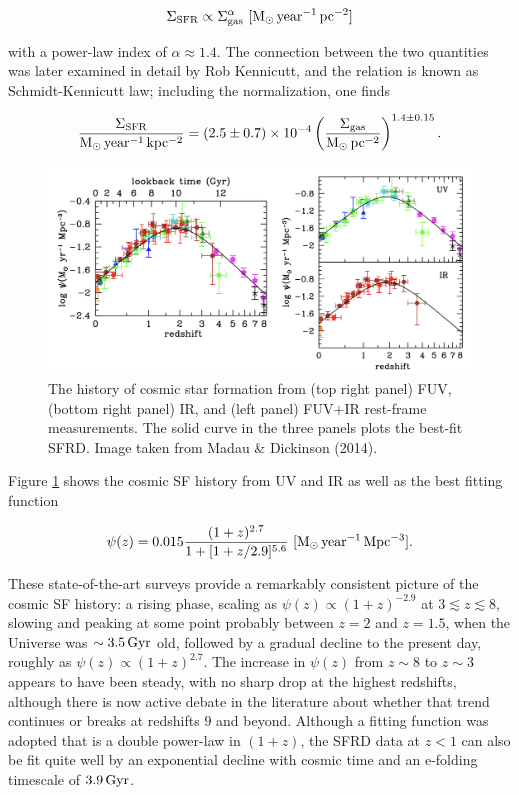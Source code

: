 \documentclass[a4paper,11pt]{article}
\begin{document}
\begin{align*}
    \Sigma_\mathrm{SFR} \propto \Sigma_\mathrm{gas}^\alpha ~ [{\rm M_\odot\,year^{-1}\,pc^{-2}}]
\end{align*}

{\noindent}with a power-law index of $\alpha\approx1.4$. The connection between the two quantities was later examined in detail by Rob Kennicutt, and the relation is known as Schmidt-Kennicutt law; including the normalization, one finds

\begin{align*}
    \frac{\Sigma_\mathrm{SFR}}{{\rm M_\odot\,year^{-1}\,kpc^{-2}}} = (2.5\pm0.7)\times10^{-4} \left(\frac{\Sigma_\mathrm{gas}}{{\rm M_\odot\,pc^{-2}}}\right)^{1.4\pm0.15}.
\end{align*}

\begin{figure}[h]
    \centering
    \includegraphics[width=16cm]{figures/SFhistory.png}
    \caption{\footnotesize{The history of cosmic star formation from (top right panel) FUV, (bottom right panel) IR, and (left panel) FUV+IR rest-frame measurements. The solid curve in the three panels plots the best-fit SFRD. Image taken from Madau \& Dickinson (2014).}}
    \label{fig:sfhistory}
\end{figure}

{\noindent}Figure \ref{fig:sfhistory} shows the cosmic SF history from UV and IR as well as the best fitting function

\begin{align*}
    \psi(z) = 0.015\frac{(1+z)^{2.7}}{1+[1+z/2.9]^{5.6}} ~ [{\rm M_\odot\,year^{-1}\,Mpc^{-3}}].
\end{align*}

{\noindent}These state-of-the-art surveys provide a remarkably consistent picture of the cosmic SF history: a rising phase, scaling as $\psi(z)\propto(1+z)^{-2.9}$ at $3\lesssim z\lesssim8$, slowing and peaking at some point probably between $z=2$ and $z=1.5$, when the Universe was $\sim3.5\,{\rm Gyr}$ old, followed by a gradual decline to the present day, roughly as $\psi(z)\propto(1+z)^{2.7}$. The increase in $\psi(z)$ from $z\sim8$ to $z\sim3$ appears to have been steady, with no sharp drop at the highest redshifts, although there is now active debate in the literature about whether that trend continues or breaks at redshifts $9$ and beyond. Although a fitting function was adopted that is a double power-law in $(1+z)$, the SFRD data at $z<1$ can also be fit quite well by an exponential decline with cosmic time and an e-folding timescale of $3.9\,{\rm Gyr}$.
\end{document}
